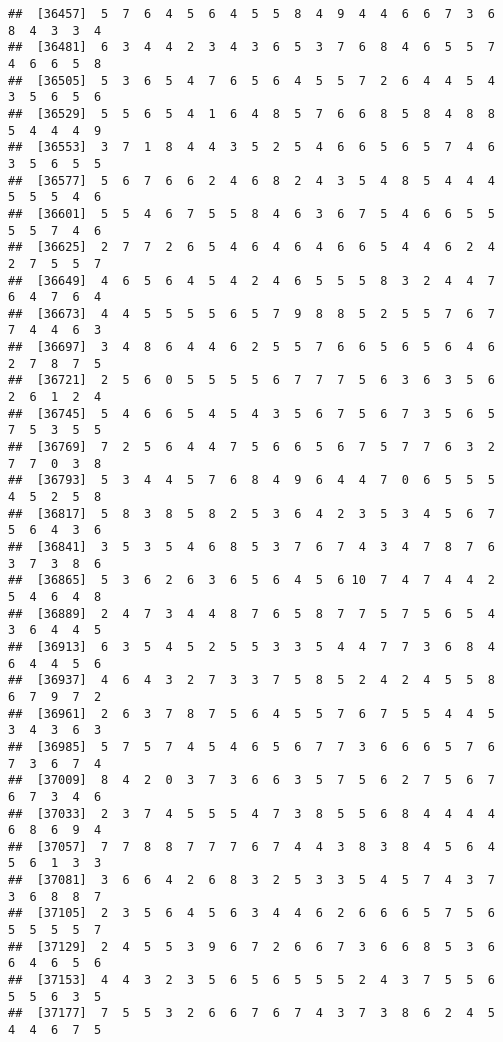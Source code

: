 \documentclass[
]{book}
\begin{document}
\begin{verbatim}
##  [36457]  5  7  6  4  5  6  4  5  5  8  4  9  4  4  6  6  7  3  6  8  4  3  3  4
##  [36481]  6  3  4  4  2  3  4  3  6  5  3  7  6  8  4  6  5  5  7  4  6  6  5  8
##  [36505]  5  3  6  5  4  7  6  5  6  4  5  5  7  2  6  4  4  5  4  3  5  6  5  6
##  [36529]  5  5  6  5  4  1  6  4  8  5  7  6  6  8  5  8  4  8  8  5  4  4  4  9
##  [36553]  3  7  1  8  4  4  3  5  2  5  4  6  6  5  6  5  7  4  6  3  5  6  5  5
##  [36577]  5  6  7  6  6  2  4  6  8  2  4  3  5  4  8  5  4  4  4  5  5  5  4  6
##  [36601]  5  5  4  6  7  5  5  8  4  6  3  6  7  5  4  6  6  5  5  5  5  7  4  6
##  [36625]  2  7  7  2  6  5  4  6  4  6  4  6  6  5  4  4  6  2  4  2  7  5  5  7
##  [36649]  4  6  5  6  4  5  4  2  4  6  5  5  5  8  3  2  4  4  7  6  4  7  6  4
##  [36673]  4  4  5  5  5  5  6  5  7  9  8  8  5  2  5  5  7  6  7  7  4  4  6  3
##  [36697]  3  4  8  6  4  4  6  2  5  5  7  6  6  5  6  5  6  4  6  2  7  8  7  5
##  [36721]  2  5  6  0  5  5  5  5  6  7  7  7  5  6  3  6  3  5  6  2  6  1  2  4
##  [36745]  5  4  6  6  5  4  5  4  3  5  6  7  5  6  7  3  5  6  5  7  5  3  5  5
##  [36769]  7  2  5  6  4  4  7  5  6  6  5  6  7  5  7  7  6  3  2  7  7  0  3  8
##  [36793]  5  3  4  4  5  7  6  8  4  9  6  4  4  7  0  6  5  5  5  4  5  2  5  8
##  [36817]  5  8  3  8  5  8  2  5  3  6  4  2  3  5  3  4  5  6  7  5  6  4  3  6
##  [36841]  3  5  3  5  4  6  8  5  3  7  6  7  4  3  4  7  8  7  6  3  7  3  8  6
##  [36865]  5  3  6  2  6  3  6  5  6  4  5  6 10  7  4  7  4  4  2  5  4  6  4  8
##  [36889]  2  4  7  3  4  4  8  7  6  5  8  7  7  5  7  5  6  5  4  3  6  4  4  5
##  [36913]  6  3  5  4  5  2  5  5  3  3  5  4  4  7  7  3  6  8  4  6  4  4  5  6
##  [36937]  4  6  4  3  2  7  3  3  7  5  8  5  2  4  2  4  5  5  8  6  7  9  7  2
##  [36961]  2  6  3  7  8  7  5  6  4  5  5  7  6  7  5  5  4  4  5  3  4  3  6  3
##  [36985]  5  7  5  7  4  5  4  6  5  6  7  7  3  6  6  6  5  7  6  7  3  6  7  4
##  [37009]  8  4  2  0  3  7  3  6  6  3  5  7  5  6  2  7  5  6  7  6  7  3  4  6
##  [37033]  2  3  7  4  5  5  5  4  7  3  8  5  5  6  8  4  4  4  4  6  8  6  9  4
##  [37057]  7  7  8  8  7  7  7  6  7  4  4  3  8  3  8  4  5  6  4  5  6  1  3  3
##  [37081]  3  6  6  4  2  6  8  3  2  5  3  3  5  4  5  7  4  3  7  3  6  8  8  7
##  [37105]  2  3  5  6  4  5  6  3  4  4  6  2  6  6  6  5  7  5  6  5  5  5  5  7
##  [37129]  2  4  5  5  3  9  6  7  2  6  6  7  3  6  6  8  5  3  6  6  4  6  5  6
##  [37153]  4  4  3  2  3  5  6  5  6  5  5  5  2  4  3  7  5  5  6  5  5  6  3  5
##  [37177]  7  5  5  3  2  6  6  7  6  7  4  3  7  3  8  6  2  4  5  4  4  6  7  5

\end{verbatim}
\end{document}
